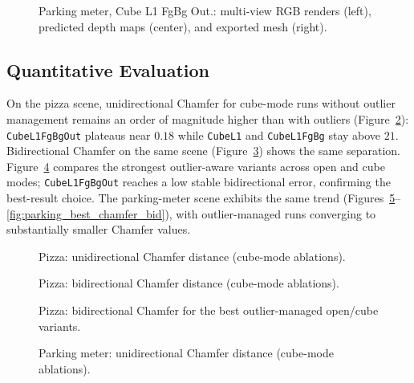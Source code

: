 \begin{figure}[H]
    \centering
    \caption{Parking meter, Cube L1 FgBg Out.: multi-view RGB renders (left), predicted depth maps (center), and exported mesh (right).}
    \label{fig:best_parking_qual}
\end{figure}

\subsection{Quantitative Evaluation}
\label{subsec:results_best_quant}

On the pizza scene, unidirectional Chamfer for cube-mode runs without outlier management remains an order of magnitude higher than with outliers (Figure~\ref{fig:pizza_cube_chamfer_uni}): \texttt{CubeL1FgBgOut} plateaus near $0.18$ while \texttt{CubeL1} and \texttt{CubeL1FgBg} stay above $21$. Bidirectional Chamfer on the same scene (Figure~\ref{fig:pizza_cube_chamfer_bid}) shows the same separation. Figure~\ref{fig:pizza_best_chamfer_bid} compares the strongest outlier-aware variants across open and cube modes; \texttt{CubeL1FgBgOut} reaches a low stable bidirectional error, confirming the best-result choice. The parking-meter scene exhibits the same trend (Figures~\ref{fig:parking_cube_chamfer_uni}--\ref{fig:parking_best_chamfer_bid}), with outlier-managed runs converging to substantially smaller Chamfer values.

\begin{figure}[H]
    \centering
    \caption{Pizza: unidirectional Chamfer distance (cube-mode ablations).}
    \label{fig:pizza_cube_chamfer_uni}
\end{figure}

\begin{figure}[H]
    \centering
    \caption{Pizza: bidirectional Chamfer distance (cube-mode ablations).}
    \label{fig:pizza_cube_chamfer_bid}
\end{figure}

\begin{figure}[H]
    \centering
    \caption{Pizza: bidirectional Chamfer for the best outlier-managed open/cube variants.}
    \label{fig:pizza_best_chamfer_bid}
\end{figure}

\begin{figure}[H]
    \centering
    \caption{Parking meter: unidirectional Chamfer distance (cube-mode ablations).}
    \label{fig:parking_cube_chamfer_uni}
\end{figure}

